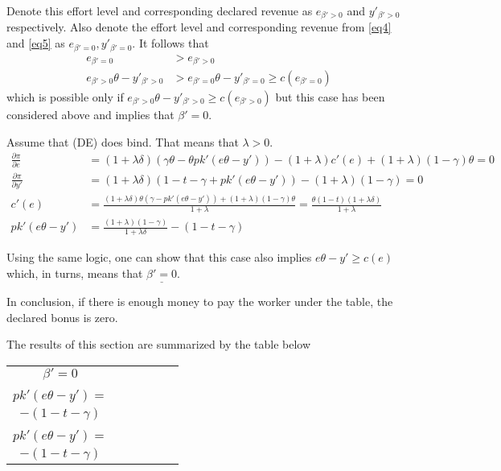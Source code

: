 \documentclass[a4paper]{article}
\begin{document}
Denote this effort level and corresponding declared revenue as $e_{\beta' >0}$ and $y'_{\beta'>0}$ respectively. Also denote the effort level and corresponding revenue from \eqref{eq4} and \eqref{eq5} as $e_{\beta'=0}, y'_{\beta'=0}$. It follows that
\begin{align*}
e_{\beta'=0} &> e_{\beta'>0}\\
e_{\beta'>0}\theta - y'_{\beta'>0} &> e_{\beta'=0}\theta - y'_{\beta'=0} \ge c(e_{\beta'=0})
\end{align*}
which is possible only if $e_{\beta'>0}\theta - y'_{\beta'>0} \ge c(e_{\beta'>0})$ but this case has been considered above and implies that $\beta' = 0$.


Assume that (DE) does bind. That means that $\lambda > 0$.
\begin{align*}
\frac{\partial \pi}{\partial e} &= (1 + \lambda \delta)(\gamma \theta - \theta p k'(e \theta - y')) - (1+\lambda)c'(e) + (1+\lambda)(1-\gamma)\theta = 0\\
\frac{\partial \pi}{\partial y'} &= (1+\lambda \delta)(1 - t - \gamma+pk'(e\theta - y')) - (1+\lambda)(1-\gamma) = 0\\
c'(e) &= \frac{(1+\lambda \delta)\theta(\gamma - pk'(e \theta - y'))+ (1+\lambda)(1-\gamma)\theta}{1+\lambda} = \frac{\theta(1-t)(1 + \lambda \delta)}{1+\lambda}\\
pk'(e\theta - y') &= \frac{(1+\lambda)(1-\gamma)}{1+\lambda \delta} - (1 - t - \gamma)
\end{align*}


Using the same logic, one can show that this case also implies $e \theta - y' \ge c(e)$ which, in turns, means that $\underline{\beta' = 0}$.

In conclusion, if there is enough money to pay the worker under the table, the declared bonus is zero.

The results of this section are summarized by the table below
\begin{center} 
	\begin{tabular}{ |c|c|c|c|c|c| } 
		\hline 
		& \makecell{$\lambda>0$}&\makecell{$\lambda=0$} \\ 
		\hline 
		$\beta' = 0$ & \makecell{$c'(e) = \frac{(1+\lambda\delta)\theta(1-t)}{\gamma(1 + \lambda)}$\\\\$pk'(e\theta - y') =$\\$ -(1 - t - \gamma)$} & \makecell{$c'(e) = \frac{\theta(1-t)}{\gamma}$\\\\$pk'(e\theta - y') =$\\$ -(1 - t - \gamma)$}\\
		\hline
	\end{tabular} 
\end{center}
\end{document}
